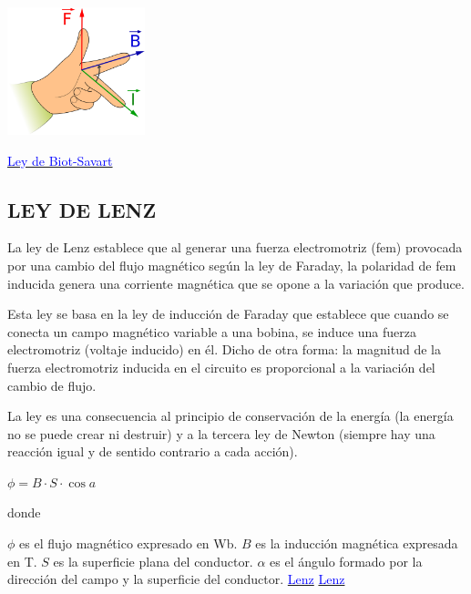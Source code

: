 \documentclass[10pt]{article}
\begin{document}
\begin{multicols}{2}
\begin{center}
	\includegraphics[width=0.3\textwidth]{Imagenes/ManoLaplace.png}
\end{center}
\href{https://www.youtube.com/watch?v=WSDVvHvIEk4}{\textcolor{blue}{Ley de Biot-Savart}} 
\subsection{LEY DE LENZ}
La ley de Lenz establece que al generar una fuerza electromotriz (fem) provocada por una cambio del flujo magnético según la ley de Faraday, la polaridad de fem inducida genera una corriente magnética que se opone a la variación que produce.

Esta ley se basa en la ley de inducción de Faraday que establece que cuando se conecta un campo magnético variable a una bobina, se induce una fuerza electromotriz (voltaje inducido) en él. Dicho de otra forma: la magnitud de la fuerza electromotriz inducida en el circuito es proporcional a la variación del cambio de flujo.

La ley es una consecuencia al principio de conservación de la energía (la energía no se puede crear ni destruir) y a la tercera ley de Newton (siempre hay una reacción igual y de sentido contrario a cada acción).


\begin{center}
	$ \phi = B \cdot S \cdot \cos{a}$
\end{center}
donde

$ \phi$ es el flujo magnético expresado en Wb.
$B$ es la inducción magnética expresada en T.
$S$ es la superficie plana del conductor.
$ \alpha $ es el ángulo formado por la dirección del campo y la superficie del conductor.
\href{https://www.youtube.com/watch?v=Grgiuwo4bUY}{\textcolor{blue}{Lenz}} 
\href{https://www.youtube.com/watch?v=ywlsOYtDXHE}{\textcolor{blue}{Lenz}} 




\end{multicols}
\end{document}
